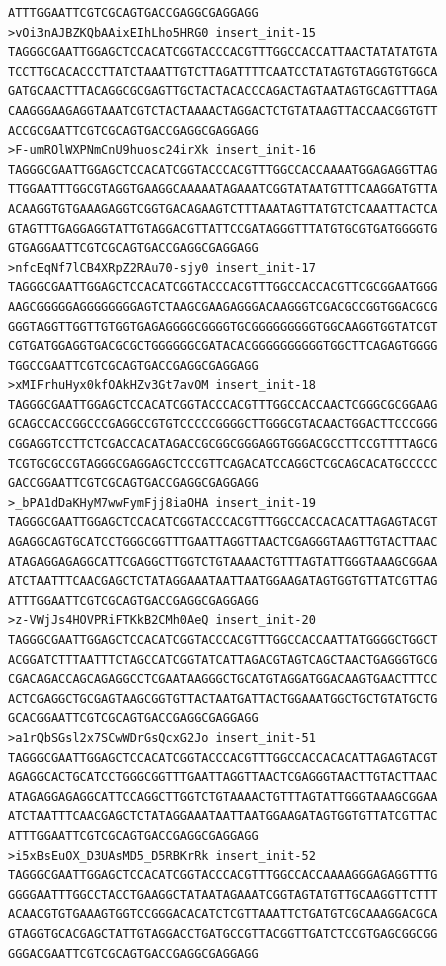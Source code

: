 \documentclass[11pt]{article}
\begin{document}
\begin{verbatim}
ATTTGGAATTCGTCGCAGTGACCGAGGCGAGGAGG
>vOi3nAJBZKQbAAixEIhLho5HRG0 insert_init-15
TAGGGCGAATTGGAGCTCCACATCGGTACCCACGTTTGGCCACCATTAACTATATATGTA
TCCTTGCACACCCTTATCTAAATTGTCTTAGATTTTCAATCCTATAGTGTAGGTGTGGCA
GATGCAACTTTACAGGCGCGAGTTGCTACTACACCCAGACTAGTAATAGTGCAGTTTAGA
CAAGGGAAGAGGTAAATCGTCTACTAAAACTAGGACTCTGTATAAGTTACCAACGGTGTT
ACCGCGAATTCGTCGCAGTGACCGAGGCGAGGAGG
>F-umROlWXPNmCnU9huosc24irXk insert_init-16
TAGGGCGAATTGGAGCTCCACATCGGTACCCACGTTTGGCCACCAAAATGGAGAGGTTAG
TTGGAATTTGGCGTAGGTGAAGGCAAAAATAGAAATCGGTATAATGTTTCAAGGATGTTA
ACAAGGTGTGAAAGAGGTCGGTGACAGAAGTCTTTAAATAGTTATGTCTCAAATTACTCA
GTAGTTTGAGGAGGTATTGTAGGACGTTATTCCGATAGGGTTTATGTGCGTGATGGGGTG
GTGAGGAATTCGTCGCAGTGACCGAGGCGAGGAGG
>nfcEqNf7lCB4XRpZ2RAu70-sjy0 insert_init-17
TAGGGCGAATTGGAGCTCCACATCGGTACCCACGTTTGGCCACCACGTTCGCGGAATGGG
AAGCGGGGGAGGGGGGGGAGTCTAAGCGAAGAGGGACAAGGGTCGACGCCGGTGGACGCG
GGGTAGGTTGGTTGTGGTGAGAGGGGCGGGGTGCGGGGGGGGGTGGCAAGGTGGTATCGT
CGTGATGGAGGTGACGCGCTGGGGGGCGATACACGGGGGGGGGGTGGCTTCAGAGTGGGG
TGGCCGAATTCGTCGCAGTGACCGAGGCGAGGAGG
>xMIFrhuHyx0kfOAkHZv3Gt7avOM insert_init-18
TAGGGCGAATTGGAGCTCCACATCGGTACCCACGTTTGGCCACCAACTCGGGCGCGGAAG
GCAGCCACCGGCCCGAGGCCGTGTCCCCCGGGGCTTGGGCGTACAACTGGACTTCCCGGG
CGGAGGTCCTTCTCGACCACATAGACCGCGGCGGGAGGTGGGACGCCTTCCGTTTTAGCG
TCGTGCGCCGTAGGGCGAGGAGCTCCCGTTCAGACATCCAGGCTCGCAGCACATGCCCCC
GACCGGAATTCGTCGCAGTGACCGAGGCGAGGAGG
>_bPA1dDaKHyM7wwFymFjj8iaOHA insert_init-19
TAGGGCGAATTGGAGCTCCACATCGGTACCCACGTTTGGCCACCACACATTAGAGTACGT
AGAGGCAGTGCATCCTGGGCGGTTTGAATTAGGTTAACTCGAGGGTAAGTTGTACTTAAC
ATAGAGGAGAGGCATTCGAGGCTTGGTCTGTAAAACTGTTTAGTATTGGGTAAAGCGGAA
ATCTAATTTCAACGAGCTCTATAGGAAATAATTAATGGAAGATAGTGGTGTTATCGTTAG
ATTTGGAATTCGTCGCAGTGACCGAGGCGAGGAGG
>z-VWjJs4HOVPRiFTKkB2CMh0AeQ insert_init-20
TAGGGCGAATTGGAGCTCCACATCGGTACCCACGTTTGGCCACCAATTATGGGGCTGGCT
ACGGATCTTTAATTTCTAGCCATCGGTATCATTAGACGTAGTCAGCTAACTGAGGGTGCG
CGACAGACCAGCAGAGGCCTCGAATAAGGGCTGCATGTAGGATGGACAAGTGAACTTTCC
ACTCGAGGCTGCGAGTAAGCGGTGTTACTAATGATTACTGGAAATGGCTGCTGTATGCTG
GCACGGAATTCGTCGCAGTGACCGAGGCGAGGAGG
>a1rQbSGsl2x7SCwWDrGsQcxG2Jo insert_init-51
TAGGGCGAATTGGAGCTCCACATCGGTACCCACGTTTGGCCACCACACATTAGAGTACGT
AGAGGCACTGCATCCTGGGCGGTTTGAATTAGGTTAACTCGAGGGTAACTTGTACTTAAC
ATAGAGGAGAGGCATTCCAGGCTTGGTCTGTAAAACTGTTTAGTATTGGGTAAAGCGGAA
ATCTAATTTCAACGAGCTCTATAGGAAATAATTAATGGAAGATAGTGGTGTTATCGTTAC
ATTTGGAATTCGTCGCAGTGACCGAGGCGAGGAGG
>i5xBsEuOX_D3UAsMD5_D5RBKrRk insert_init-52
TAGGGCGAATTGGAGCTCCACATCGGTACCCACGTTTGGCCACCAAAAGGGAGAGGTTTG
GGGGAATTTGGCCTACCTGAAGGCTATAATAGAAATCGGTAGTATGTTGCAAGGTTCTTT
ACAACGTGTGAAAGTGGTCCGGGACACATCTCGTTAAATTCTGATGTCGCAAAGGACGCA
GTAGGTGCACGAGCTATTGTAGGACCTGATGCCGTTACGGTTGATCTCCGTGAGCGGCGG
GGGACGAATTCGTCGCAGTGACCGAGGCGAGGAGG

\end{verbatim}
\end{document}
